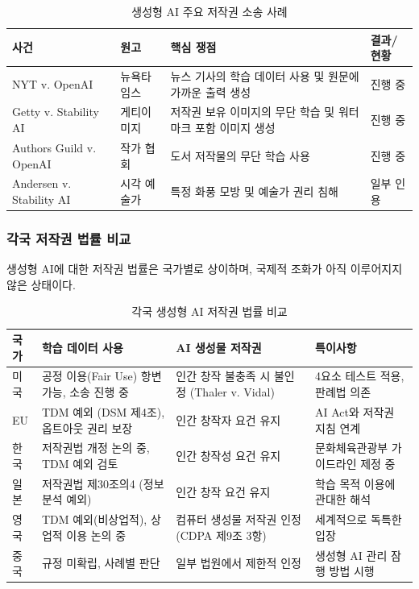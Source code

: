 \begin{table}[htbp]
\centering
\caption{생성형 AI 주요 저작권 소송 사례}
\label{tab:gen_lawsuits}
\begin{tabularx}{\textwidth}{p{2.5cm}p{2.5cm}Xp{3cm}}
\toprule
\textbf{사건} & \textbf{원고} & \textbf{핵심 쟁점} & \textbf{결과/현황} \\
\midrule
NYT v. OpenAI & 뉴욕타임스 & 뉴스 기사의 학습 데이터 사용 및 원문에 가까운 출력 생성 & 진행 중 \\
Getty v. Stability AI & 게티이미지 & 저작권 보유 이미지의 무단 학습 및 워터마크 포함 이미지 생성 & 진행 중 \\
Authors Guild v. OpenAI & 작가 협회 & 도서 저작물의 무단 학습 사용 & 진행 중 \\
Andersen v. Stability AI & 시각 예술가 & 특정 화풍 모방 및 예술가 권리 침해 & 일부 인용 \\
\bottomrule
\end{tabularx}
\end{table}

\subsubsection{각국 저작권 법률 비교}

생성형 AI에 대한 저작권 법률은 국가별로 상이하며, 국제적 조화가 아직 이루어지지 않은 상태이다.

\begin{table}[htbp]
\centering
\caption{각국 생성형 AI 저작권 법률 비교}
\label{tab:gen_copyright_global}
\begin{tabularx}{\textwidth}{p{1.5cm}p{3cm}p{3cm}X}
\toprule
\textbf{국가} & \textbf{학습 데이터 사용} & \textbf{AI 생성물 저작권} & \textbf{특이사항} \\
\midrule
미국 & 공정 이용(Fair Use) 항변 가능, 소송 진행 중 & 인간 창작 불충족 시 불인정 (Thaler v. Vidal) & 4요소 테스트 적용, 판례법 의존 \\
EU & TDM 예외 (DSM 제4조), 옵트아웃 권리 보장 & 인간 창작자 요건 유지 & AI Act와 저작권 지침 연계 \\
한국 & 저작권법 개정 논의 중, TDM 예외 검토 & 인간 창작성 요건 유지 & 문화체육관광부 가이드라인 제정 중 \\
일본 & 저작권법 제30조의4 (정보 분석 예외) & 인간 창작 요건 유지 & 학습 목적 이용에 관대한 해석 \\
영국 & TDM 예외(비상업적), 상업적 이용 논의 중 & 컴퓨터 생성물 저작권 인정 (CDPA 제9조 3항) & 세계적으로 독특한 입장 \\
중국 & 규정 미확립, 사례별 판단 & 일부 법원에서 제한적 인정 & 생성형 AI 관리 잠행 방법 시행 \\
\bottomrule
\end{tabularx}
\end{table}

